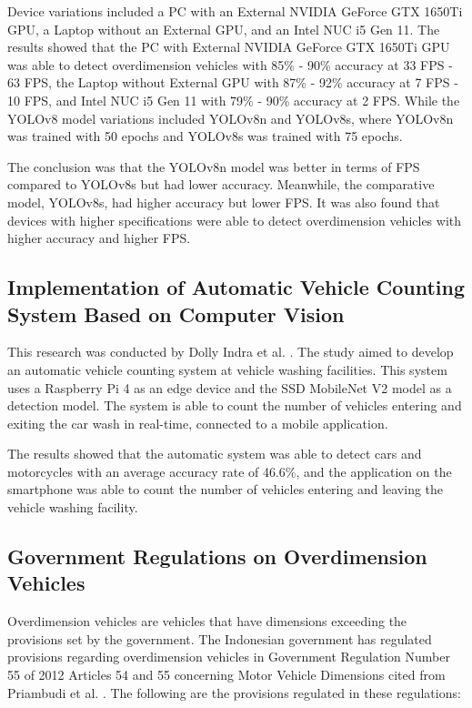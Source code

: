 Device variations included a PC with an External NVIDIA GeForce GTX 1650Ti GPU, a Laptop without an External GPU, and an Intel NUC i5 Gen 11. The results showed that the PC with External NVIDIA GeForce GTX 1650Ti GPU was able to detect overdimension vehicles with 85\% - 90\% accuracy at 33 FPS - 63 FPS, the Laptop without External GPU with 87\% - 92\% accuracy at 7 FPS - 10 FPS, and Intel NUC i5 Gen 11 with 79\% - 90\% accuracy at 2 FPS. While the YOLOv8 model variations included YOLOv8n and YOLOv8s, where YOLOv8n was trained with 50 epochs and YOLOv8s was trained with 75 epochs.

The conclusion was that the YOLOv8n model was better in terms of FPS compared to YOLOv8s but had lower accuracy. Meanwhile, the comparative model, YOLOv8s, had higher accuracy but lower FPS. It was also found that devices with higher specifications were able to detect overdimension vehicles with higher accuracy and higher FPS.

\subsection{\textbf{Implementation of Automatic Vehicle Counting System Based on Computer Vision}}
\label{subsec:implementasisistemhitungkendaraan}
This research was conducted by Dolly Indra et al. \cite{dolly2023}. The study aimed to develop an automatic vehicle counting system at vehicle washing facilities. This system uses a Raspberry Pi 4 as an edge device and the SSD MobileNet V2 model as a detection model. The system is able to count the number of vehicles entering and exiting the car wash in real-time, connected to a mobile application.

The results showed that the automatic system was able to detect cars and motorcycles with an average accuracy rate of 46.6\%, and the application on the smartphone was able to count the number of vehicles entering and leaving the vehicle washing facility.

\subsection{\textbf{Government Regulations on Overdimension Vehicles}}

Overdimension vehicles are vehicles that have dimensions exceeding the provisions set by the government. The Indonesian government has regulated provisions regarding overdimension vehicles in Government Regulation Number 55 of 2012 Articles 54 and 55 concerning Motor Vehicle Dimensions cited from Priambudi et al. \cite{Priambudi2020Pre-study}. The following are the provisions regulated in these regulations:

